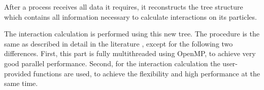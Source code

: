 After a process receives all data it requires, it reconstructs the
tree structure which contains all information necessary to calculate
interactions on its particles.

The interaction calculation is performed using this new tree. The
procedure is the same as described in detail in the literature
\cite{1990JCoPh..87..161B, 1991PASJ...43..859M}, except for the
following two differences.  First, this part is fully multithreaded
using OpenMP, to achieve very good parallel performance. Second, for
the interaction calculation the user-provided functions are used, to
achieve the flexibility and high performance at the same time.

